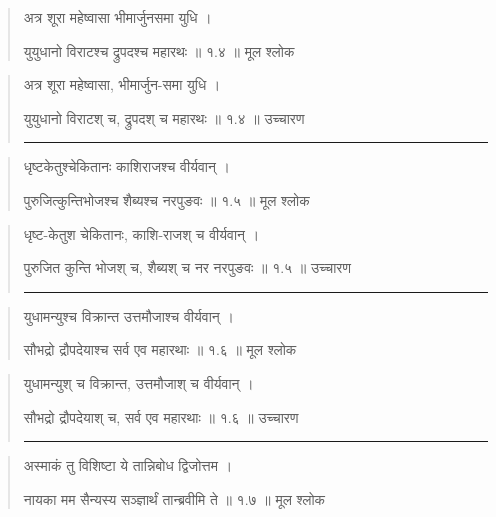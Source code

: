 \begin{quotation} 

अत्र शूरा महेष्वासा भीमार्जुनसमा युधि  ।  

युयुधानो विराटश्च द्रुपदश्च महारथः  ॥ १.४ ॥  मूल श्लोक
\end{quotation}

\begin{quotation}

अत्र शूरा महेष्वासा, भीमार्जुन-समा युधि  ।  

युयुधानो विराटश् च, द्रुपदश् च महारथः  ॥ १.४ ॥  उच्चारण

\noindent\rule{16cm}{0.4pt} 
\end{quotation}


\begin{quotation} 


धृष्टकेतुश्चेकितानः काशिराजश्च वीर्यवान्‌  ।  

पुरुजित्कुन्तिभोजश्च शैब्यश्च नरपुङवः  ॥ १.५ ॥  मूल श्लोक
\end{quotation}

\begin{quotation}

धृष्ट-केतुश चेकितानः, काशि-राजश् च वीर्यवान्  ।  

पुरुजित कुन्ति भोजश् च, शैब्यश्  च नर नरपुङवः  ॥ १.५ ॥  उच्चारण

\noindent\rule{16cm}{0.4pt} 
\end{quotation}


\begin{quotation} 

युधामन्युश्च विक्रान्त उत्तमौजाश्च वीर्यवान्‌  ।  

सौभद्रो द्रौपदेयाश्च सर्व एव महारथाः  ॥ १.६ ॥  मूल श्लोक
\end{quotation}

\begin{quotation}

युधामन्युश् च विक्रान्त, उत्तमौजाश् च वीर्यवान्  ।  

सौभद्रो द्रौपदेयाश् च, सर्व एव महारथाः  ॥ १.६ ॥  उच्चारण

\noindent\rule{16cm}{0.4pt} 
\end{quotation}


\begin{quotation} 

अस्माकं तु विशिष्टा ये तान्निबोध द्विजोत्तम  ।  

नायका मम सैन्यस्य सञ्ज्ञार्थं तान्ब्रवीमि ते  ॥ १.७ ॥  मूल श्लोक
\end{quotation}

